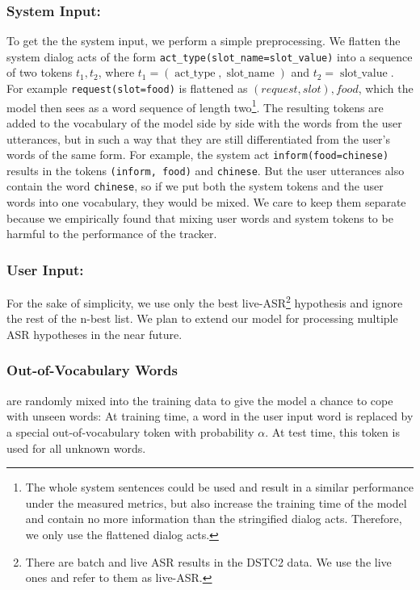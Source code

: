 \documentclass[11pt,twocolumn]{article}
\begin{document}
\subsubsection{System Input:}
To get the the system input, we perform a simple preprocessing. We flatten the system dialog acts of the form \texttt{act\_type(slot\_name=slot\_value)} into a sequence of two tokens $t_1, t_2$, where $t_1=(\operatorname{act\_type}, \operatorname{slot\_name})$ and $t_2=\operatorname{slot\_value}$. For example \texttt{request(slot=food)} is flattened as $(request, slot), food$, which the model then sees as a word sequence of length two\footnote{The whole system sentences could be used and result in a similar performance under the measured metrics, but also increase the training time of the model and contain no more information than the stringified dialog acts. Therefore, we only use the flattened dialog acts.}. The resulting tokens are added to the vocabulary of the model side by side with the words from the user utterances, but in such a way that they are still differentiated from the user's words of the same form. For example, the system act \texttt{inform(food=chinese)} results in the tokens \texttt{(inform, food)} and \texttt{chinese}. But the user utterances also contain the word \texttt{chinese}, so if we put both the system tokens and the user words into one vocabulary, they would be mixed. We care to keep them separate because we empirically found that mixing user words and system tokens to be harmful to the performance of the tracker.

\subsubsection{User Input:}
For the sake of simplicity, we use only the best live-ASR\footnote{There are batch and live ASR results in the DSTC2 data. We use the live ones and refer to them as live-ASR.} hypothesis and ignore the rest of the n-best list.
We plan to extend our model for processing multiple ASR hypotheses in the near future.

\subsubsection{Out-of-Vocabulary Words}
are randomly mixed into the training data to give the model a chance to cope with unseen words: At training time, a word in the user input word is replaced by a special out-of-vocabulary token with probability $\alpha$. At test time, this token is used for all unknown words.
\end{document}
